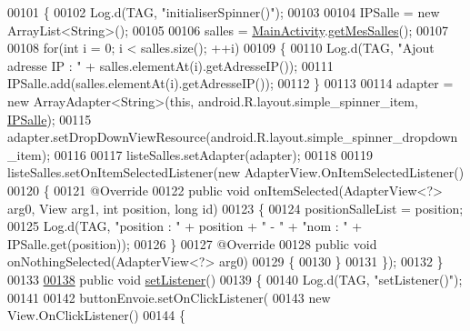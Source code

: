 \begin{DoxyCode}
00101     \{
00102         Log.d(TAG, \textcolor{stringliteral}{"initialiserSpinner()"});
00103 
00104         IPSalle = \textcolor{keyword}{new} ArrayList<String>();
00105 
00106         salles = \hyperlink{classcom_1_1lasalle_1_1meeting_1_1_main_activity}{MainActivity}.\hyperlink{classcom_1_1lasalle_1_1meeting_1_1_main_activity_a67d3733d9841e19aae3b52299844bb06}{getMesSalles}();
00107 
00108         \textcolor{keywordflow}{for}(\textcolor{keywordtype}{int} i = 0; i < salles.size(); ++i)
00109         \{
00110             Log.d(TAG, \textcolor{stringliteral}{"Ajout adresse IP : "} + salles.elementAt(i).getAdresseIP());
00111             IPSalle.add(salles.elementAt(i).getAdresseIP());
00112         \}
00113 
00114         adapter = \textcolor{keyword}{new} ArrayAdapter<String>(\textcolor{keyword}{this}, android.R.layout.simple\_spinner\_item, 
      \hyperlink{classcom_1_1lasalle_1_1meeting_1_1_configuration_salle_activity_a74bb868ae39746bae6533c1735207abf}{IPSalle});
00115         adapter.setDropDownViewResource(android.R.layout.simple\_spinner\_dropdown\_item);
00116 
00117         listeSalles.setAdapter(adapter);
00118 
00119         listeSalles.setOnItemSelectedListener(\textcolor{keyword}{new} AdapterView.OnItemSelectedListener()
00120         \{
00121             @Override
00122             \textcolor{keyword}{public} \textcolor{keywordtype}{void} onItemSelected(AdapterView<?> arg0, View arg1, \textcolor{keywordtype}{int} position, \textcolor{keywordtype}{long} \textcolor{keywordtype}{id})
00123             \{
00124                 positionSalleList = position;
00125                 Log.d(TAG, \textcolor{stringliteral}{"position : "} + position + \textcolor{stringliteral}{" - "} + \textcolor{stringliteral}{"nom : "} + IPSalle.get(position));
00126             \}
00127             @Override
00128             \textcolor{keyword}{public} \textcolor{keywordtype}{void} onNothingSelected(AdapterView<?> arg0)
00129             \{
00130             \}
00131         \});
00132     \}
00133 
\hyperlink{classcom_1_1lasalle_1_1meeting_1_1_configuration_salle_activity_a8d3eea01718b9535c88caa796d8b6377}{00138}     \textcolor{keyword}{public} \textcolor{keywordtype}{void} \hyperlink{classcom_1_1lasalle_1_1meeting_1_1_configuration_salle_activity_a8d3eea01718b9535c88caa796d8b6377}{setListener}()
00139     \{
00140         Log.d(TAG, \textcolor{stringliteral}{"setListener()"});
00141 
00142         buttonEnvoie.setOnClickListener(
00143             \textcolor{keyword}{new} View.OnClickListener()
00144             \{

\end{DoxyCode}
